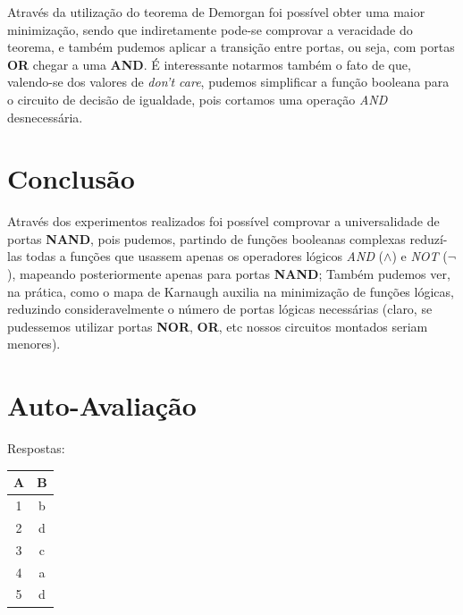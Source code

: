 \documentclass[12pt]{article}
\begin{document}
Através da utilização do teorema de Demorgan foi possível obter uma maior
minimização, sendo que indiretamente pode-se comprovar a veracidade do teorema,
e também pudemos aplicar a transição entre portas, ou seja, com portas
\textbf{OR} chegar a uma \textbf{AND}. É interessante notarmos também o fato de
que, valendo-se dos valores de \emph{don't care}, pudemos simplificar a função
booleana para o circuito de decisão de igualdade, pois cortamos uma operação
\emph{AND} desnecessária.

\section{Conclusão}
\label{sec:Conclusao}

Através dos experimentos realizados foi possível comprovar a universalidade de
portas \textbf{NAND}, pois pudemos, partindo de funções booleanas complexas
reduzí-las todas a funções que usassem apenas os operadores lógicos \emph{AND}
(\(\land\)) e \emph{NOT} (\(\lnot\)), mapeando posteriormente apenas para portas
\textbf{NAND}; Também pudemos ver, na prática, como o mapa de Karnaugh auxilia
na minimização de funções lógicas, reduzindo consideravelmente o número de
portas lógicas necessárias (claro, se pudessemos utilizar portas \textbf{NOR},
\textbf{OR}, etc nossos circuitos montados seriam menores).

\nocite{*}



\newpage
\section*{Auto-Avaliação}

Respostas:

\begin{table}[H]
    \begin{tabular}{|c|c|} \hline
    \textbf{A} & \textbf{B}\\
    \hline
    1 & b \\ \hline
    2 & d \\ \hline
    3 & c \\ \hline
    4 & a \\ \hline
    5 & d \\ \hline
    \end{tabular}
\end{table}
\end{document}
